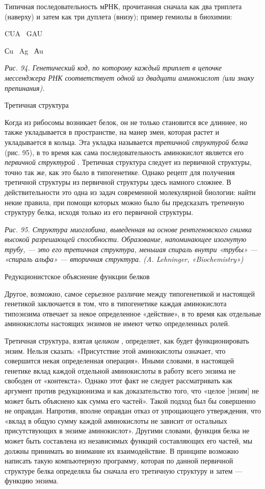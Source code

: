 \documentclass[../main.tex]{subfiles}
\begin{document}
Типичная последовательность мРНК, прочитанная сначала как два триплета (наверху) и затем как три дуплета (внизу); пример гемиолы в биохимии:

CUA ~GAU

Сu ~Ag ~Аu

\emph{Рис. 94. Генетический код, по которому каждый триплет в цепочке мессенджера РНК соответствует одной из двадцати аминокислот (или знаку препинания).}

Третичная структура

Когда из рибосомы возникает белок, он не только становится все длиннее, но также укладывается в пространстве, на манер змеи, которая растет и укладывается в кольца. Эта укладка называется \emph{третичной структурой белка} (рис. 95), в то время как сама последовательность аминокислот является его \emph{первичной структурой} . Третичная структура следует из первичной структуры, точно так же, как это было в типогенетике. Однако рецепт для получения третичной структуры из первичной структуры здесь намного сложнее. В действительности это одна из задач современной молекулярной биологии: найти некие правила, при помощи которых можно было бы предсказать третичную структуру белка, исходя только из его первичной структуры.

\emph{Рис. 95. Структура миоглобина, выведенная на основе рентгеновского снимка высокой разрешающей способности. Образование, напоминающее изогнутую трубу, --- это его третичная структура, меньшая спираль внутри «трубы» --- «спираль альфа» --- вторичная структура. (A. Lehninger, «Biochemistry»)}

Редукционистское объяснение функции белков

Другое, возможно, самое серьезное различие между типогенетикой и настоящей генетикой заключается в том, что в типогенетике каждая аминокислота типоэнзима отвечает за некое определенное «действие», в то время как отдельные аминокислоты настоящих энзимов не имеют четко определенных ролей.

Третичная структура, взятая \emph{целиком} , определяет, как будет функционировать энзим. Нельзя сказать: «Присутствие этой аминокислоты означает, что совершится некая определенная операция». Иными словами, в настоящей генетике вклад каждой отдельной аминокислоты в работу всего энзима не свободен от «контекста». Однако этот факт не следует рассматривать как аргумент против редукционизма и как доказательство того, что «целое {[}энзим{]} не может быть объяснено как сумма его частей». Такой подход был бы совершенно не оправдан. Напротив, вполне оправдан отказ от упрощающего утверждения, что «вклад в общую сумму каждой аминокислоты не зависит от остальных присутствующих в энзиме аминокислот». Другими словами, функция белка не может быть составлена из независимых функций составляющих его частей, мы должны принимать во внимание их взаимодействие. В принципе возможно написать такую компьютерную программу, которая по данной первичной структуре белка определяла бы сначала его третичную структуру и затем --- функцию энзима.
\end{document}
